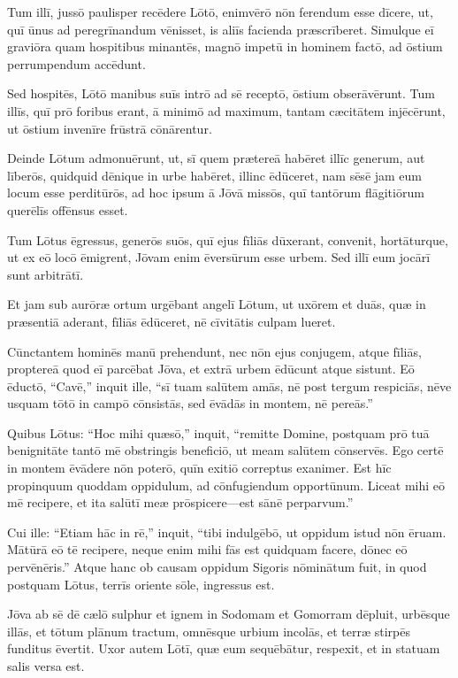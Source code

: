 \Versus Tum illī, jussō paulisper recēdere Lōtō, enimvērō nōn ferendum esse dīcere, ut, quī ūnus ad peregrīnandum vēnisset, is aliīs facienda præscrīberet. Simulque eī graviōra quam hospitibus minantēs, magnō impetū in hominem factō, ad ōstium perrumpendum accēdunt.

\Versus Sed hospitēs, Lōtō manibus suīs intrō ad sē receptō, ōstium obserāvērunt.
\Versus Tum illīs, quī prō foribus erant, ā minimō ad maximum, tantam cæcitātem injēcērunt, ut ōstium invenīre frūstrā cōnārentur.

\Versus Deinde Lōtum admonuērunt, ut, sī quem prætereā habēret illīc generum, aut līberōs, quidquid dēnique in urbe habēret, illinc ēdūceret,
\Versus nam sēsē jam eum locum esse perditūrōs, ad hoc ipsum ā Jōvā missōs, quī tantōrum flāgitiōrum querēlīs offēnsus esset.

\Versus Tum Lōtus ēgressus, generōs suōs, quī ejus fīliās dūxerant, convenit, hortāturque, ut ex eō locō ēmigrent, Jōvam enim ēversūrum esse urbem. Sed illī eum jocārī sunt arbitrātī.

\Versus Et jam sub aurōræ ortum urgēbant angelī Lōtum, ut uxōrem et duās, quæ in præsentiā aderant, fīliās ēdūceret, nē cīvitātis culpam lueret.

\Versus Cūnctantem hominēs manū prehendunt, nec nōn ejus conjugem, atque fīliās, proptereā quod eī parcēbat Jōva, et extrā urbem ēdūcunt atque sistunt.
\Versus Eō ēductō, ``Cavē,'' inquit ille, ``sī tuam salūtem amās, nē post tergum respiciās, nēve usquam tōtō in campō cōnsistās, sed ēvādās in montem, nē pereās.''

\Versus Quibus Lōtus: ``Hoc mihi quæsō,'' inquit, ``remitte Domine,
\Versus postquam prō tuā benignitāte tantō mē obstringis beneficiō, ut meam salūtem cōnservēs. Ego certē in montem ēvādere nōn poterō, quīn exitiō correptus exanimer.
\Versus Est hīc propinquum quoddam oppidulum, ad cōnfugiendum opportūnum. Liceat mihi eō mē recipere, et ita salūtī meæ prōspicere—est sānē perparvum.''

\Versus Cui ille: ``Etiam hāc in rē,'' inquit, ``tibi indulgēbō, ut oppidum istud nōn ēruam.
\Versus Mātūrā eō tē recipere, neque enim mihi fās est quidquam facere, dōnec eō pervēnēris.'' Atque hanc ob causam oppidum Sigoris nōminātum fuit,
\Versus in quod postquam Lōtus, terrīs oriente sōle, ingressus est.

\Versus Jōva ab sē dē cælō sulphur et ignem in Sodomam et Gomorram dēpluit,
\Versus urbēsque illās, et tōtum plānum tractum, omnēsque urbium incolās, et terræ stirpēs funditus ēvertit. 
\Versus Uxor autem Lōtī, quæ eum sequēbātur, respexit, et in statuam salis versa est.

